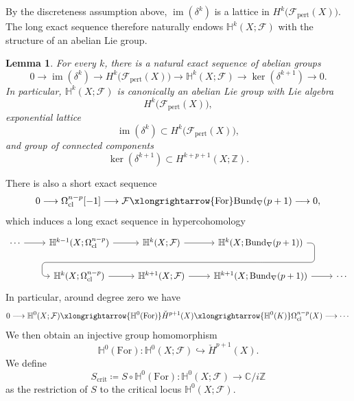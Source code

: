 \documentclass[12pt]{amsart}
\numberwithin{table}{section}
\numberwithin{equation}{section}
\newtheorem{lem}{Lemma}[section]
\theoremstyle{plain}
\newcommand{\sF}{\mathcal{F}}
\newcommand{\C}{\mathbb{C}}
\newcommand{\Z}{\mathbb{Z}}
\begin{document}
By the discreteness assumption above, $\operatorname{im}(\delta^k)$ is a lattice in $H^k\bigl(\sF_{\mathrm{pert}}(X)\bigr)$. The long exact sequence therefore naturally endows $\mathbb H^k(X;\sF)$ with the structure of an abelian Lie group.

\begin{lem}\label{lem:master-hypercohomology}
	For every $k$, there is a natural exact sequence of abelian groups
	\begin{equation}\label{eq:master-hypercohomology}
		0
		\longrightarrow \operatorname{im}(\delta^k)
		\longrightarrow H^k\bigl(\sF_{\mathrm{pert}}(X)\bigr)
		\longrightarrow \mathbb H^k(X;\sF)
		\longrightarrow \ker(\delta^{k+1})
		\longrightarrow 0.
	\end{equation}
	In particular, $\mathbb H^k(X;\sF)$ is canonically an abelian Lie group with
	Lie algebra
	\[
	H^k\bigl(\sF_{\mathrm{pert}}(X)\bigr),
	\]
	exponential lattice
	\[
	\operatorname{im}(\delta^k)
	\subset H^k\bigl(\sF_{\mathrm{pert}}(X)\bigr),
	\]
	and group of connected components
	\[
	\ker(\delta^{k+1})
	\subset H^{k+p+1}(X;\Z).
	\]
\end{lem}

There is also a short exact sequence
\[
0\longrightarrow \Omega_{\mathrm{cl}}^{n-p}[-1]
\longrightarrow \sF
\xlongrightarrow{\mathrm{For}} \mathrm{Bund}_\nabla(p+1)
\longrightarrow 0,
\]
which induces a long exact sequence in hypercohomology
\[
\begin{tikzcd}
	\cdots \arrow[r]
	&
	\mathbb H^{k-1}(X;\Omega_{\mathrm{cl}}^{n-p}) \arrow[r]
	&
	\mathbb H^k(X;\sF) \arrow[r]
	&
	\mathbb H^k(X;\mathrm{Bund}_\nabla(p+1))
	\arrow[dll, "\delta"', rounded corners, to path={
		-- ([xshift=2ex]\tikztostart.east)
		|- ([yshift=-3ex]\tikztostart.south)
		-| ([xshift=-2ex]\tikztotarget.west)
		-- (\tikztotarget)
	}]
	\\
	&
	\mathbb H^{k}(X;\Omega_{\mathrm{cl}}^{n-p}) \arrow[r]
	&
	\mathbb H^{k+1}(X;\sF) \arrow[r]
	&
	\mathbb H^{k+1}(X;\mathrm{Bund}_\nabla(p+1)) \arrow[r]
	&
	\cdots
\end{tikzcd}
\]
In particular, around degree zero we have
\[
0  \longrightarrow \mathbb H^0(X;\sF) \xlongrightarrow{\mathbb{H}^0(\mathrm{For})} %
\check{H}^{p+1}(X) \xlongrightarrow{\mathbb{H}^0(K)} \Omega^{n-p}_{\mathrm{cl}}(X) \longrightarrow \cdots
\]
We then obtain an injective group homomorphism
\[
\mathbb{H}^0(\mathrm{For}): \mathbb H^0(X; \sF) \hookrightarrow \check{H}^{p+1}(X).
\]
We define
\[
S_{\mathrm{crit}}
\coloneqq
S\circ\mathbb H^0(\mathrm{For})
\colon
\mathbb H^0(X;\sF)
\longrightarrow
\C/ i\Z
\]
as the restriction of \(S\) to the critical locus \(\mathbb H^0(X;\sF)\).
\end{document}
